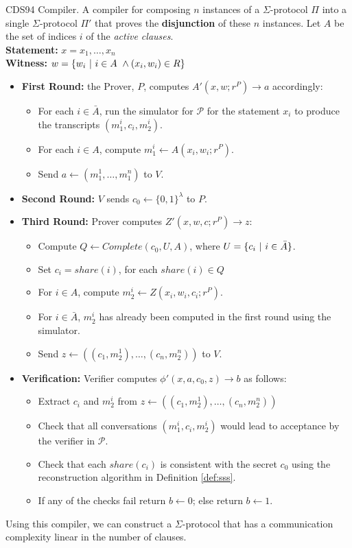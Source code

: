 \begin{protocol}[label={prot:cds-compiler}]{CDS94 Compiler. A compiler for composing $n$ instances of a 
    $\Sigma$-protocol $\Pi$ into a single $\Sigma$-protocol $\Pi'$ that proves the \textbf{disjunction} 
    of these $n$ instances.}
    Let $A$ be the set of indices $i$ of the \textit{active clauses}. \\
    \textbf{Statement:} $x = x_1,\ldots, x_n$ \\
    \textbf{Witness:} $w = \{w_i\ \vert\  i \in A\ \land (x_i, w_i) \in R\}$
    \begin{itemize}
        \item \textbf{First Round:} the Prover, $P$, computes $A'(x,w; r^P) \rightarrow a$ accordingly:
        \begin{itemize}
            \item For each $i \in \bar A$, run the simulator for $\mathcal P$ for the statement $x_i$ to produce the transcripts $(m_1^i, c_i, m_2^i)$.
            \item For each $i \in A$, compute $m_1^i \leftarrow A(x_i, w_i; r^P)$.
            \item Send $a \leftarrow (m_1^1, \ldots, m_1^n)$ to $V$.
        \end{itemize}
        \item \textbf{Second Round:} $V$ sends $c_0 \leftarrow \{0,1\}^\lambda$ to $P$. 
        \item \textbf{Third Round:} Prover computes $Z'(x,w,c;r^P) \rightarrow z$:
        \begin{itemize}
            \item Compute $Q \leftarrow Complete(c_0, U, A)$, where $U = \{c_i\ \vert\  i \in \bar A\}$.
            \item Set $c_i = share(i)$, for each $share(i) \in Q$
            \item For $i \in A$, compute $m_2^i \leftarrow Z(x_i, w_i, c_i; r^P)$. 
            \item For $i \in \bar A$, $m_2^i$ has already been computed in the first round using the simulator.
            \item Send $z \leftarrow ((c_1, m_2^1), \ldots, (c_n,m_2^n))$ to $V$.
        \end{itemize}
        \item \textbf{Verification:} Verifier computes $\phi'(x,a,c_0,z) \rightarrow b$ as follows:
        \begin{itemize}
            \item Extract $c_i$ and $m_2^i$ from $z \leftarrow ((c_1, m_2^1), \ldots, (c_n,m_2^n))$
            \item Check that all conversations $(m_1^i, c_i, m_2^i)$ would lead to acceptance by the verifier in $\mathcal P$.
            \item Check that each $share(c_i)$ is consistent with the secret $c_0$ using the reconstruction algorithm in Definition \ref{def:sss}.
            \item If any of the checks fail return $b \leftarrow 0$; else return $b \leftarrow 1$.
        \end{itemize}
    \end{itemize}
\end{protocol}

Using this compiler, we can construct a $\Sigma$-protocol that has a communication complexity linear in the number of clauses.